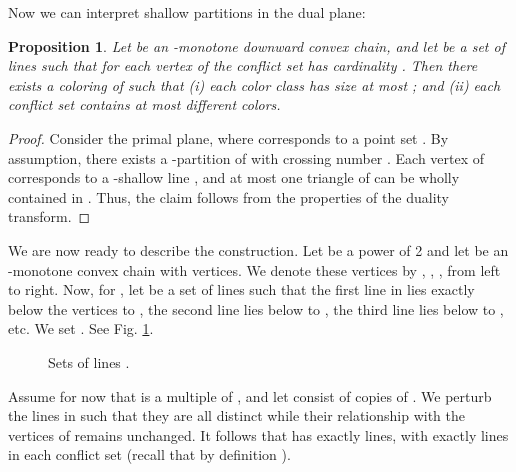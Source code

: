 \documentclass{paper}
\newtheorem {prop}[theorem] {Proposition}
\begin{document}
Now we can interpret shallow partitions in the dual plane:
\begin{prop}\label{prop:dualpartition}
Let  be an -monotone downward convex chain, and let
 be a set of  lines such that for each
vertex  of  the conflict set  has cardinality .
Then there exists a coloring of  
such that (i) each color class 
has size at most ; and (ii) each conflict set  contains
at most  different colors.
\end{prop}
\begin{proof}
Consider the primal plane, where  corresponds to a point set .
By assumption, there exists a -partition  of  
with crossing number . Each vertex  of  
corresponds 
to a -shallow line , and at most one triangle of  
can be wholly contained in . Thus, the claim follows from the 
properties of the duality transform.
\end{proof}

We are now ready to describe the construction. 
Let  be a power of 2 and 
let  be an -monotone convex chain with  vertices.
We denote these vertices by
, , , from left to right. 
Now, for , let
 be a set of  lines such that
the first line in  lies exactly below the vertices  to ,
the second line lies below  to ,
the third line lies below  to ,
etc. We set . See Fig. \ref{fig:Ls}.
\begin{center}
\begin{figure}[htb] 
  \centering{} 
  \centering{} 
     \centering{} 
     \caption{Sets of lines .} 
       
     \label{fig:Ls} 
\end{figure}
\end{center}













Assume for now that  is a multiple of ,
and let  consist of  copies of . We perturb the
lines in  such that they are all distinct while
their relationship with the vertices of  remains unchanged.
It follows that  has exactly  lines, with 
exactly  lines in each conflict set  (recall that by definition
).
\end{document}
